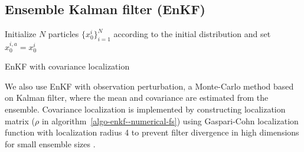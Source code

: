 \subsection{Ensemble Kalman filter (EnKF)} \label{ssec-enkf--numerical-fs}
\begin{algorithm}[!t]
Initialize $N$ particles $\{x_0^i\}_{i=1}^N$ according to the initial distribution and set $x_0^{i,a}=x_0^i$ \\
 \caption{EnKF with covariance localization}
\label{algo-enkf--numerical-fs} 
\end{algorithm}
We also use EnKF \cite{Evensen07} with observation perturbation, a Monte-Carlo method based on Kalman filter, where the mean and covariance are estimated from the ensemble. Covariance localization is implemented by constructing localization matrix ($\rho$ in algorithm~\ref{algo-enkf--numerical-fs}) using Gaspari-Cohn localization function with localization radius 4 to prevent filter divergence in high dimensions for small ensemble sizes \cite{farchi2018comparison}.
